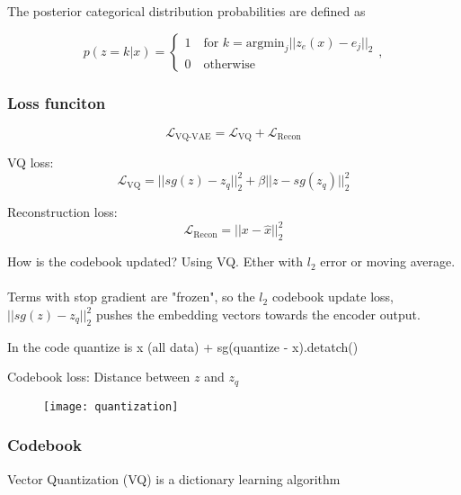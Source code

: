 \documentclass[../../thesis.tex]{subfiles}
\begin{document}
The posterior categorical distribution probabilities are defined as

\begin{equation}
    p(z=k | x) = 
    \begin{cases} 
        1 \quad \text{for }k = \textrm{argmin}_j||z_e(x) - e_j||_2 \\
        0 \quad \text{otherwise}
    \end{cases},
\end{equation}


\subsubsection{Loss funciton}
\begin{equation}
    \mathcal{L}_{\text{VQ-VAE}} = \mathcal{L}_{\text{VQ}} + \mathcal{L}_{\text{Recon}}
\end{equation}


VQ loss: 
\begin{equation}
    \mathcal{L}_{\text{VQ}} = ||sg(z) - z_q||_2^2 +\beta||z - sg(z_q)||_2^2
\end{equation}
     
Reconstruction loss:
\begin{equation}
    \mathcal{L}_{\text{Recon}} = ||x - \widehat{x}||_2^2
\end{equation}

How is the codebook updated? Using VQ. Ether with $l_2$ error or moving average. \\\\

Terms with stop gradient are "frozen", so the $l_2$ codebook update loss, $||sg(z) - z_q ||_2^2$ pushes the embedding vectors towards the encoder output. 

In the code quantize is x (all data) + sg(quantize - x).detatch()



Codebook loss: Distance between $z$ and $z_q$ 


\begin{figure}[h]
    \texttt{[image: quantization]}
    \centering    
\end{figure}





\subsubsection{Codebook}
Vector Quantization (VQ) is a dictionary learning algorithm 
\end{document}
